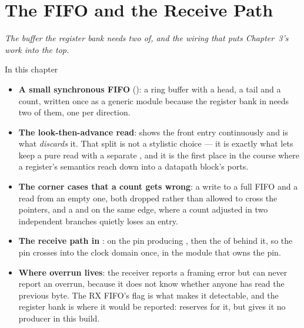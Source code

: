 
\chapter{The FIFO and the Receive Path}
\label{c4:ch}

{\large\itshape The buffer the register bank needs two of, and the wiring that puts
Chapter~3's work into the top.\par}

\begin{chapterbox}{In this chapter}
\begin{itemize}
  \item \textbf{A small synchronous FIFO} (): a ring buffer with a head, a tail and a
    count, written once as a generic module because the register bank in  needs two of
    them, one per direction.
  \item \textbf{The look-then-advance read}:  shows the front entry continuously and
     is what \emph{discards} it. That split is not a stylistic choice --- it is exactly what
    lets  keep  a pure read with a separate , and it is the
    first place in the course where a register's semantics reach down into a datapath block's
    ports.
  \item \textbf{The corner cases that a count gets wrong}: a write to a full FIFO and a read from an
    empty one, both dropped rather than allowed to cross the pointers, and a  and 
    on the same edge, where a count adjusted in two independent branches quietly loses an entry.
  \item \textbf{The receive path in }:  on the  pin producing
    , then the  of  behind it, so the pin crosses into the clock
    domain once, in the module that owns the pin.
  \item \textbf{Where overrun lives}: the receiver reports a framing error but can never report an
    overrun, because it does not know whether anyone has read the previous byte. The RX FIFO's
     flag is what makes it detectable, and the register bank is where it would be
    reported:  reserves  for it, but gives it no producer in this build.
\end{itemize}
\end{chapterbox}

